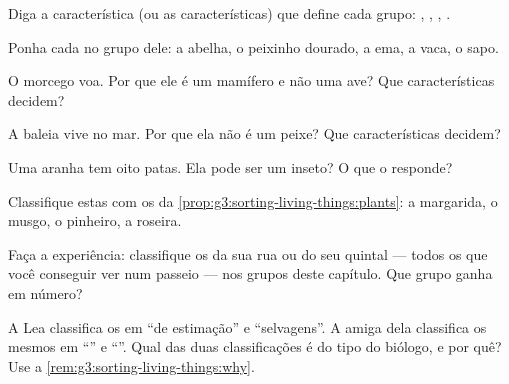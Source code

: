 \begin{exercise}[$\star$]\label{exo:g3:sorting-living-things:2}
Diga a característica (ou as características) que define cada grupo:
, , , .
\end{exercise}

\begin{exercise}[$\star$]\label{exo:g3:sorting-living-things:3}
Ponha cada  no grupo dele: a abelha, o peixinho dourado, a
ema, a vaca, o sapo.
\end{exercise}

\begin{exercise}[$\star$]\label{exo:g3:sorting-living-things:4}
O morcego voa. Por que ele é um mamífero e não uma ave? Que
características decidem?
\end{exercise}

\begin{exercise}[$\star$]\label{exo:g3:sorting-living-things:5}
A baleia vive no mar. Por que ela não é um peixe? Que
características decidem?
\end{exercise}

\begin{exercise}[$\star$]\label{exo:g3:sorting-living-things:6}
Uma aranha tem oito patas. Ela pode ser um inseto? O que o 
responde?
\end{exercise}

\begin{exercise}[$\star$]\label{exo:g3:sorting-living-things:7}
Classifique estas  com os  da
\cref{prop:g3:sorting-living-things:plants}: a margarida, o musgo, o
pinheiro, a roseira.
\end{exercise}

\begin{exercise}[$\star$]\label{exo:g3:sorting-living-things:8}
Faça a experiência: classifique os  da sua rua ou do seu
quintal --- todos os que você conseguir ver num passeio --- nos
grupos deste capítulo. Que grupo ganha em número?
\end{exercise}

\begin{exercise}[$\star\star$]\label{exo:g3:sorting-living-things:9}
A Lea classifica os  em ``de estimação'' e ``selvagens''. A
amiga dela classifica os mesmos  em ``'' e ``''.
Qual das duas classificações é do tipo do biólogo, e por quê? Use a
\cref{rem:g3:sorting-living-things:why}.
\end{exercise}

